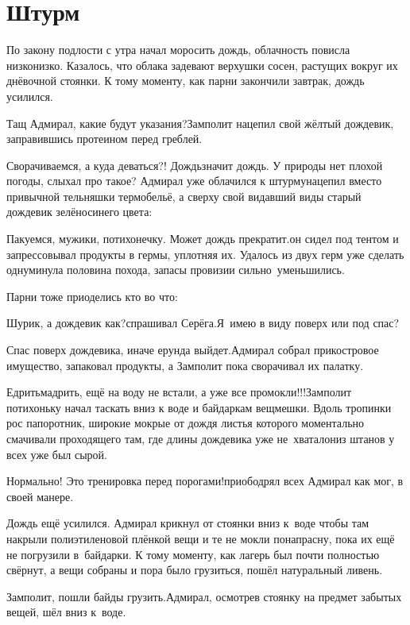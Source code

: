 \chapter{Штурм}
\vepsianrose

По закону подлости с утра начал моросить дождь, облачность повисла низко\sdash низко. Казалось, что облака задевают верхушки сосен, растущих вокруг их днёвочной стоянки. К тому моменту, как парни закончили завтрак, дождь усилился.

\diagdash Тащ Адмирал, какие будут указания?\mdash Замполит нацепил свой жёлтый дождевик, заправившись протеином перед греблей.

\diagdash Сворачиваемся, а куда деваться?! Дождь\mdash значит дождь. У природы нет плохой погоды, слыхал про такое? \mdash Адмирал уже облачился к штурму\mdash нацепил вместо привычной тельняшки термобельё, а сверху свой видавший виды старый дождевик зелёно\sdash синего цвета:

\diagdash Пакуемся, мужики, потихонечку. Может дождь прекратит.\mdash он сидел под тентом и запрессовывал продукты в гермы, уплотняя их. Удалось из двух герм уже сделать одну\mdash минула половина похода, запасы провизии сильно~уменьшились.

Парни тоже приоделись кто во что: 

\diagdash Шурик, а дождевик как?\mdash спрашивал Серёга.\mdash Я~имею в виду поверх или под спас?

\diagdash Спас поверх дождевика, иначе ерунда выйдет.\mdash Адмирал собрал прикостровое имущество, запаковал продукты, а Замполит пока сворачивал их палатку.

\diagdash Едрить\sdash мадрить, ещё на воду не встали, а уже все промокли!!!\mdash Замполит потихоньку начал таскать вниз к воде и байдаркам вещмешки. Вдоль тропинки рос папоротник, широкие мокрые от дождя листья которого моментально смачивали проходящего там, где длины дождевика уже не~хватало\mdash низ штанов у всех уже был сырой.

\diagdash Нормально! Это тренировка перед порогами!\mdash приободрял всех Адмирал как мог, в своей манере.

Дождь ещё усилился. Адмирал крикнул от стоянки вниз к~воде чтобы там накрыли полиэтиленовой плёнкой вещи и те не мокли понапрасну, пока их ещё не погрузили в~байдарки. К тому моменту, как лагерь был почти полностью свёрнут, а вещи собраны и пора было грузиться, пошёл натуральный ливень.

\diagdash Замполит, пошли байды грузить.\mdash Адмирал, осмотрев стоянку на предмет забытых вещей, шёл вниз к~воде.

